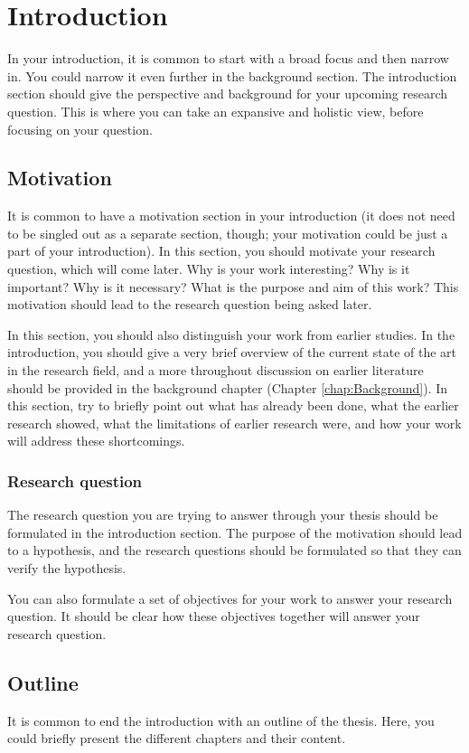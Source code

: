 \chapter{Introduction}
\label{chap:Introduction}

In your introduction, it is common to start with a broad focus and then narrow in. You could narrow it even further in the background section. The introduction section should give the perspective and background for your upcoming research question. This is where you can take an expansive and holistic view, before focusing on your question.

\section{Motivation}

It is common to have a motivation section in your introduction (it does not need to be singled out as a separate section, though; your motivation could be just a part of your introduction). In this section, you should motivate your research question, which will come later. Why is your work interesting? Why is it important? Why is it necessary? What is the purpose and aim of this work? This motivation should lead to the research question being asked later.

In this section, you should also distinguish your work from earlier studies. In the introduction, you should give a very brief overview of the current state of the art in the research field, and a more throughout discussion on earlier literature should be provided in the background chapter (Chapter \ref{chap:Background}). In this section, try to briefly point out what has already been done, what the earlier research showed, what the limitations of earlier research were, and how your work will address these shortcomings.


\subsection{Research question}

The research question you are trying to answer through your thesis should be formulated in the introduction section. The purpose of the motivation should lead to a hypothesis, and the research questions should be formulated so that they can verify the hypothesis.

You can also formulate a set of objectives for your work to answer your research question.  It should be clear how these objectives together will answer your research question.

\section{Outline}

It is common to end the introduction with an outline of the thesis. Here, you could briefly present the different chapters and their content.